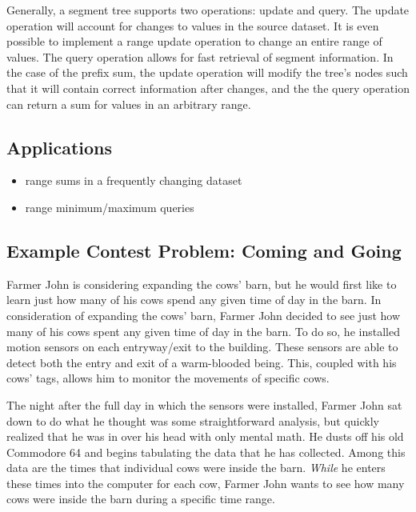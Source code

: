 
Generally, a segment tree supports two operations: update and query.
The update operation will account for changes to values in the source dataset.
It is even possible to implement a range update operation to change an entire range of values.
The query operation allows for fast retrieval of segment information.
In the case of the prefix sum, the update operation will modify the tree's nodes such that it will contain correct information after changes, and the the query operation can return a sum for values in an arbitrary range.

\subsection{Applications}

\begin{itemize}
    \item range sums in a frequently changing dataset
    \item range minimum/maximum queries
\end{itemize}

\subsection{Example Contest Problem: Coming and Going}

Farmer John is considering expanding the cows' barn, but he would first like to learn just how many of his cows spend any given time of day in the barn.
In consideration of expanding the cows' barn, Farmer John decided to see just how many of his cows spent any given time of day in the barn.
To do so, he installed motion sensors on each entryway/exit to the building.
These sensors are able to detect both the entry and exit of a warm-blooded being.
This, coupled with his cows' tags, allows him to monitor the movements of specific cows.

The night after the full day in which the sensors were installed, Farmer John sat down to do what he thought was some straightforward analysis, but quickly realized that he was in over his head with only mental math.
He dusts off his old Commodore 64 and begins tabulating the data that he has collected.
Among this data are the times that individual cows were inside the barn.
\textit{While} he enters these times into the computer for each cow, Farmer John wants to see how many cows were inside the barn during a specific time range.

